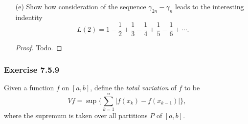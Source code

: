 \begin{enumerate}
		Prove that \( (\gamma_{n}) \) converges. The constant \( \gamma = \lim \gamma_{n} \) is called Euler's constant. 
		\begin{proof}
	    	Todo.
		\end{proof}
	\item[(e)] Show how consideration of the sequence \( \gamma_{2n} - \gamma_{n}    \) leads to the interesting indentity 
		\[  L(2) = 1 - \frac{ 1 }{ 2 } + \frac{ 1 }{ 3 } - \frac{ 1 }{ 4 } + \frac{ 1 }{ 5 } - \frac{ 1 }{ 6 } + \dotsb.  \]
		\begin{proof}
		    Todo.
		\end{proof}
\end{enumerate}



\subsubsection{Exercise 7.5.9} Given a function \( f  \) on \( [a,b]  \), define the \textit{total variation} of \( f  \) to be 
\[  Vf = \sup \Bigg\{ \sum_{ k=1 }^{ n } | f(x_{k}) - f(x_{k-1}) |  \Bigg\},  \]
where the supremum is taken over all partitions \( P  \) of \( [a,b] \).
